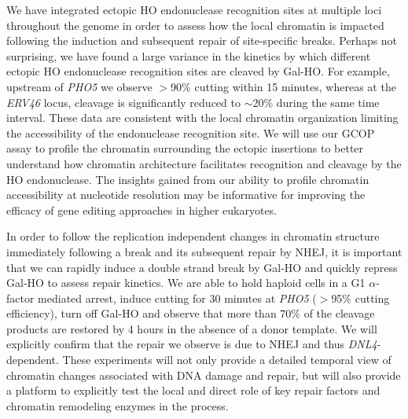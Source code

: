  We have integrated ectopic HO endonuclease recognition sites at multiple loci throughout the genome in order to assess how the local chromatin is impacted following the induction and subsequent repair of site-specific breaks.  Perhaps not surprising, we have found a large variance in the kinetics by which different ectopic HO endonuclease recognition sites are cleaved by Gal-HO.  For example, upstream of \textit{PHO5} we observe $>$90\% cutting within 15 minutes, whereas at the \textit{ERV46} locus, cleavage is significantly reduced to $\sim$20\% during the same time interval.  These data are consistent with the local chromatin organization limiting the accessibility of the endonuclease recognition site.  We will use our GCOP assay to profile the chromatin surrounding the ectopic insertions to better understand how chromatin architecture facilitates recognition and cleavage by the HO endonuclease. The insights gained from our ability to profile chromatin accessibility at nucleotide resolution may be informative for improving the efficacy of gene editing approaches in higher eukaryotes.

In order to follow the replication independent changes in chromatin structure immediately following a break and its subsequent repair by NHEJ, it is important that we can rapidly induce a double strand break by Gal-HO and quickly repress Gal-HO to assess repair kinetics.  We are able to hold haploid cells in a G1 $\alpha$-factor mediated arrest, induce cutting for 30 minutes at \textit{PHO5} ($>$95\% cutting efficiency), turn off Gal-HO and observe that more than 70\% of the cleavage products are restored by 4 hours in the absence of a donor template.  We will explicitly confirm that the repair we observe is due to NHEJ and thus \textit{DNL4}-dependent.  These experiments will not only provide a detailed temporal view of chromatin changes associated with DNA damage and repair, but will also provide a platform to explicitly test the local and direct role of key repair factors and chromatin remodeling enzymes in the process.